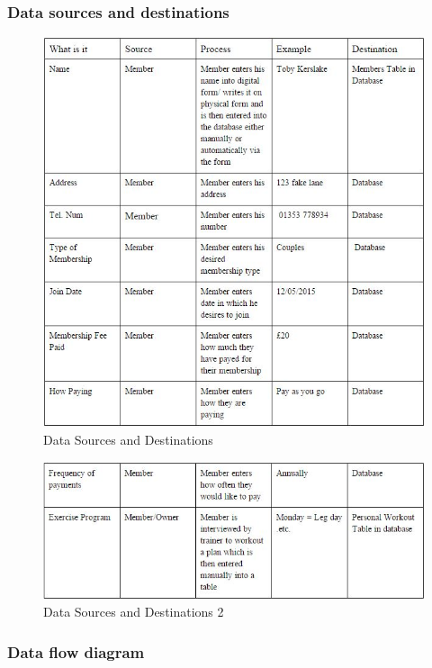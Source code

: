 \subsubsection{Data sources and destinations}

\begin{figure}[H]
    \includegraphics[width=\textwidth]{ProposedSources.jpg}
    \caption{Data Sources and Destinations} \label{fig: Data Sources and Destinations }
\end{figure}

\begin{figure}[H]
    \includegraphics[width=\textwidth]{ProposedSources2.jpg}
    \caption{Data Sources and Destinations 2} \label{fig: Data Sources and Destinations 2 }
\end{figure}

\subsubsection{Data flow diagram}


